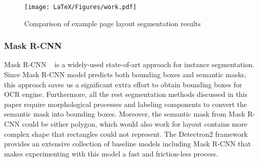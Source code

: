 \documentclass[letterpaper]{article} %
\begin{document}



\begin{figure}[h]
   \centering
   \texttt{[image: LaTeX/Figures/work.pdf]}
   \caption{Comparison of example page layout segmentation results}
   \label{fig:all_vis}
 \end{figure}

\subsubsection{Mask R-CNN}
Mask R-CNN ~\cite{DBLP:conf/iccv/HeGDG17} is a widely-used state-of-art approach for instance segmentation. Since Mask R-CNN model predicts both bounding boxes and semantic masks, this approach saves us a significant extra effort to obtain bounding boxes for OCR engine. Furthermore, all the rest segmentation methods discussed in this paper require morphological processes and labeling components to convert the semantic mask into bounding boxes. Moreover, the semantic mask from Mask R-CNN could be either polygon, which would also work for layout contains more complex shape that rectangles could not represent.
The Detectron2 framework ~\cite{wu2019detectron2} provides an extensive collection of baseline models including Mask R-CNN that makes experimenting with this model a fast and friction-less process.
\end{document}
